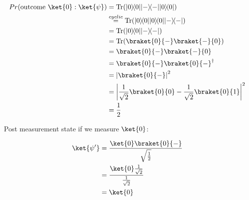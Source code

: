 \documentclass{article}
\newcommand{\ketbra}[2]{|#1\rangle\!\langle #2|}
\newcommand{\trace}{{\rm Tr}}
\newcommand{\abs}[1]{\left\lvert #1 \right\rvert}
\begin{document}
\begin{enumerate}
        $$\begin{aligned}
            Pr(\text{outcome }\ket{0}: \ket{\psi}) & =\trace(\ketbra{0}{0}\ketbra{-}{-}\ketbra{0}{0})                         \\
                                                   & \overset{cyclic}{=}\trace(\ketbra{0}{0}\ketbra{0}{0}\ketbra{-}{-})       \\
                                                   & =\trace(\ketbra{0}{0}\ketbra{-}{-})                                      \\
                                                   & =\trace(\braket{0}{-}\braket{-}{0})                                      \\
                                                   & =\braket{0}{-}\braket{-}{0}                                              \\
                                                   & =\braket{0}{-}\braket{0}{-}^\dagger                                      \\
                                                   & =\abs{\braket{0}{-}}^2                                                   \\
                                                   & =\abs{\frac{1}{\sqrt{2}}\braket{0}{0}-\frac{1}{\sqrt{2}}\braket{0}{1}}^2 \\
                                                   & =\frac{1}{2}                                                             \\
          \end{aligned}$$

        Post measurement state if we measure $\ket{0}$:

        $$\begin{aligned}
            \ket{\psi'} & =\frac{\ket{0}\braket{0}{-}}{\sqrt{\frac{1}{2}}}      \\
                        & =\frac{\ket{0}\frac{1}{\sqrt{2}}}{\frac{1}{\sqrt{2}}} \\
                        & =\ket{0}                                              \\
          \end{aligned}$$


\end{enumerate}
\end{document}
